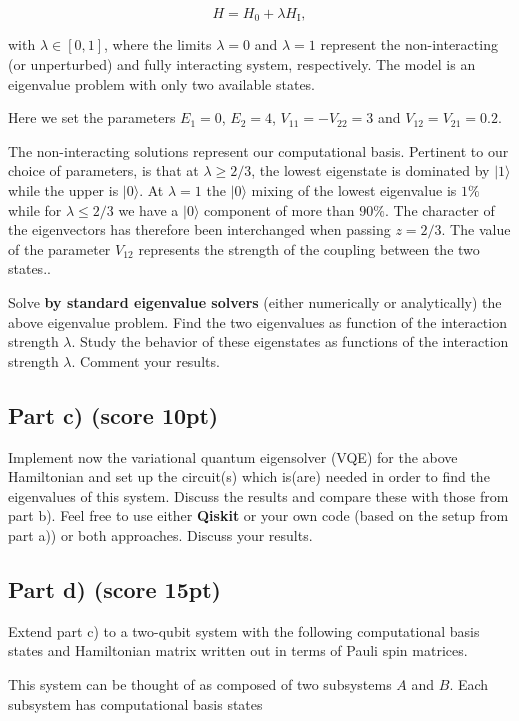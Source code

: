 \documentclass[%
oneside,                 %
final,                   %
10pt]{article}
\begin{document}
\[
H=H_0+\lambda H_\mathrm{I},
\]

with $\lambda \in [0,1]$, where the limits $\lambda=0$ and $\lambda=1$
represent the non-interacting (or unperturbed) and fully interacting
system, respectively.  The model is an eigenvalue problem with only
two available states.

Here we set the parameters $E_1=0$,
$E_2=4$, $V_{11}=-V_{22}=3$ and $V_{12}=V_{21}=0.2$.

The non-interacting solutions represent our computational basis.
Pertinent to our choice of parameters, is that at $\lambda\geq 2/3$,
the lowest eigenstate is dominated by $\vert 1\rangle$ while the upper
is $\vert 0 \rangle$. At $\lambda=1$ the $\vert 0 \rangle$ mixing of
the lowest eigenvalue is $1\%$ while for $\lambda\leq 2/3$ we have a
$\vert 0 \rangle$ component of more than $90\%$.  The character of the
eigenvectors has therefore been interchanged when passing $z=2/3$. The
value of the parameter $V_{12}$ represents the strength of the coupling
between the two states..

Solve \textbf{by standard eigenvalue solvers} (either numerically or analytically) the above eigenvalue problem.
Find the two eigenvalues as function of the interaction strength $\lambda$.
Study the behavior of these eigenstates as functions of the interaction strength $\lambda$.
Comment your results.

\subsection{Part c) (score 10pt)}

Implement now the variational quantum eigensolver (VQE) for the above
Hamiltonian and set up the circuit(s) which is(are) needed in order to find
the eigenvalues of this system. Discuss the results and compare these
with those from part b). Feel free to use either \textbf{Qiskit} or your own
code (based on the setup from part a)) or both approaches. Discuss
your results.

\subsection{Part d) (score 15pt)}

Extend part c) to a two-qubit system with the following computational
basis states and Hamiltonian matrix written out in terms of Pauli spin
matrices.

This system can be thought of as composed of two subsystems
$A$ and $B$. Each subsystem has computational basis states
\end{document}
